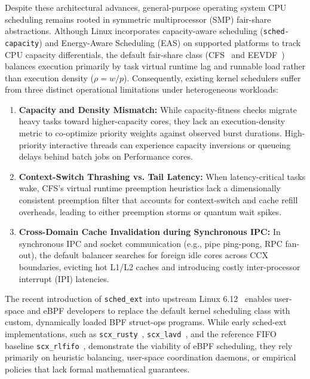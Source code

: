 \documentclass[conference]{IEEEtran}
\begin{document}
Despite these architectural advances, general-purpose operating system CPU scheduling remains rooted in symmetric multiprocessor (SMP) fair-share abstractions. Although Linux incorporates capacity-aware scheduling (\texttt{sched-capacity}) and Energy-Aware Scheduling (EAS) on supported platforms to track CPU capacity differentials, the default fair-share class (CFS~\cite{molnar2007cfs} and EEVDF~\cite{zijlstra2023eevdf,stoica1995eevdf}) balances execution primarily by task virtual runtime lag and runnable load rather than execution density ($\rho = w / p$). Consequently, existing kernel schedulers suffer from three distinct operational limitations under heterogeneous workloads:
\begin{enumerate}
    \item \textbf{Capacity and Density Mismatch:} While capacity-fitness checks migrate heavy tasks toward higher-capacity cores, they lack an execution-density metric to co-optimize priority weights against observed burst durations. High-priority interactive threads can experience capacity inversions or queueing delays behind batch jobs on Performance cores.
    \item \textbf{Context-Switch Thrashing vs. Tail Latency:} When latency-critical tasks wake, CFS's virtual runtime preemption heuristics lack a dimensionally consistent preemption filter that accounts for context-switch and cache refill overheads, leading to either preemption storms or quantum wait spikes.
    \item \textbf{Cross-Domain Cache Invalidation during Synchronous IPC:} In synchronous IPC and socket communication (e.g., pipe ping-pong, RPC fan-out), the default balancer searches for foreign idle cores across CCX boundaries, evicting hot L1/L2 caches and introducing costly inter-processor interrupt (IPI) latencies.
\end{enumerate}

The recent introduction of \texttt{sched\_ext} into upstream Linux 6.12~\cite{heo2024schedext,hodges2024schedextscale} enables user-space and eBPF developers to replace the default kernel scheduling class with custom, dynamically loaded BPF struct-ops programs. While early sched-ext implementations, such as \texttt{scx\_rusty}~\cite{hodges2024schedextscale}, \texttt{scx\_lavd}~\cite{min2024scxlavd}, and the reference FIFO baseline \texttt{scx\_rlfifo}~\cite{scx_repo}, demonstrate the viability of eBPF scheduling, they rely primarily on heuristic balancing, user-space coordination daemons, or empirical policies that lack formal mathematical guarantees.
\end{document}

